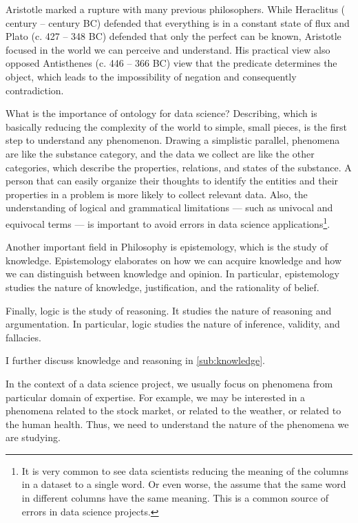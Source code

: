 Aristotle marked a rupture with many previous philosophers.  While Heraclitus (
century --  century BC) defended that everything is in a constant state of flux and
Plato (c. 427 -- 348 BC) defended that only the perfect can be known, Aristotle focused in
the world we can perceive and understand.  His practical view also opposed Antisthenes (c.
446 -- 366 BC) view that the predicate determines the object, which leads to the
impossibility of negation and consequently contradiction.

What is the importance of ontology for data science?  Describing, which is basically
reducing the complexity of the world to simple, small pieces, is the first step to
understand any phenomenon.  Drawing a simplistic parallel, phenomena are like the
substance category, and the data we collect are like the other categories, which describe
the properties, relations, and states of the substance.  A person that can easily organize
their thoughts to identify the entities and their properties in a problem is more likely
to collect relevant data.  Also, the understanding of logical and grammatical limitations
--- such as univocal and equivocal terms --- is important to avoid errors in data
science applications\footnote{It is very common to see data scientists reducing the
meaning of the columns in a dataset to a single word.  Or even worse, the assume
that the same word in different columns have the same meaning.  This is a common source
of errors in data science projects.}.

Another important field in Philosophy is epistemology, which is the study of knowledge.
Epistemology elaborates on how we can acquire knowledge and how we can distinguish between
knowledge and opinion.  In particular, epistemology studies the nature of knowledge,
justification, and the rationality of belief.

Finally, logic is the study of reasoning.  It studies the nature of reasoning and
argumentation.  In particular, logic studies the nature of inference, validity, and
fallacies.

I further discuss knowledge and reasoning in \cref{sub:knowledge}.

In the context of a data science project, we usually focus on phenomena from particular domain of
expertise.  For example, we may be interested in a phenomena related to the stock
market, or related to the weather, or related to the human
health.  Thus, we need to understand the nature of the phenomena we are studying.

